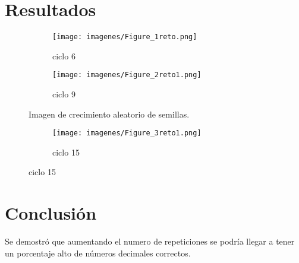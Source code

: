 \documentclass{article}
\begin{document}
\section{Resultados}
 \begin{figure}[H]
\centering
\begin{subfigure}[b]{0.40\linewidth}
\texttt{[image: imagenes/Figure\_1reto.png]}
\caption{ciclo 6}
\end{subfigure}
\begin{subfigure}[b]{0.40\linewidth}
\texttt{[image: imagenes/Figure\_2reto1.png]}
\caption{ciclo 9}
\end{subfigure}
\caption{Imagen de crecimiento aleatorio de semillas.}
\label{fig:westminster}
\end{figure}

\begin{figure}[H]
\centering
\begin{subfigure}[b]{0.40\linewidth}
\texttt{[image: imagenes/Figure\_3reto1.png]}
\caption{ciclo 15}
\end{subfigure}
\label{fig:westminster}
\end{figure}

 \section{Conclusión}

Se demostró que aumentando el numero de repeticiones se podría llegar a tener un porcentaje alto de números decimales correctos.

 
 

 
\end{document}

